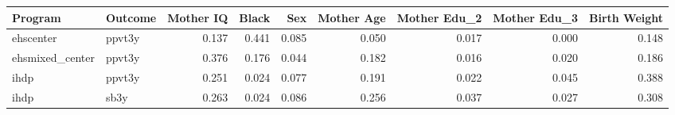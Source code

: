 \begin{table}[ht]
\centering
\begin{tabular}{llrrrrrrr}
  \hline
Program & Outcome & Mother IQ & Black & Sex & Mother Age & Mother Edu\_2 & Mother Edu\_3 & Birth Weight \\ 
  \hline
ehscenter & ppvt3y & 0.137 & 0.441 & 0.085 & 0.050 & 0.017 & 0.000 & 0.148 \\ 
  ehsmixed\_center & ppvt3y & 0.376 & 0.176 & 0.044 & 0.182 & 0.016 & 0.020 & 0.186 \\ 
  ihdp & ppvt3y & 0.251 & 0.024 & 0.077 & 0.191 & 0.022 & 0.045 & 0.388 \\ 
  ihdp & sb3y & 0.263 & 0.024 & 0.086 & 0.256 & 0.037 & 0.027 & 0.308 \\ 
   \hline
\end{tabular}
\end{table}

